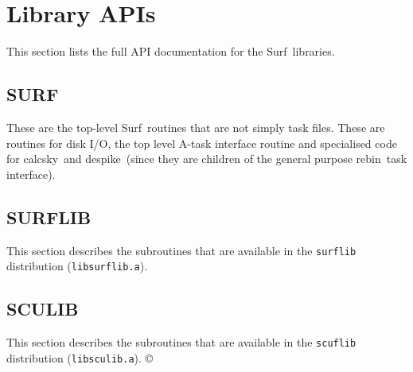 \documentclass[twoside,11pt]{article}
\newcommand{\task}[1]{{\sf #1}}
\newcommand{\rebin}{\xref{\task{rebin}}{sun216}{REBIN}}
\newcommand{\calcsky}{\xref{\task{calcsky}}{sun216}{CALCSKY}}
\newcommand{\despike}{\xref{\task{despike}}{sun216}{DESPIKE}}
\newcommand{\scusoft}          {{\sc Surf}}
\newcommand{\xref}[3]{#1}
\renewcommand{\_}{\texttt{\symbol{95}}}
\begin{document}
\section{Library APIs}

This section lists the full API documentation for the \scusoft\ 
libraries.

\subsection{SURF}

These are the top-level \scusoft\ routines that are not simply task files.
These are routines for disk I/O, the top level A-task interface routine
and specialised code for \calcsky\ and \despike\ (since they are children
of the general purpose \rebin\ task interface).



\subsection{SURFLIB}

This section describes the subroutines that are available in the
\texttt{surflib} distribution (\texttt{libsurflib.a}).




\subsection{SCULIB}

This section describes the subroutines that are available in the
\texttt{scuflib} distribution (\texttt{libsculib.a}). \copyright





\end{document}
